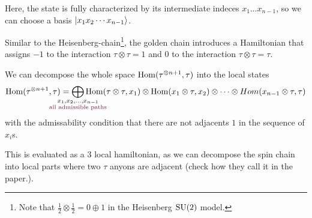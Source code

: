 
Here, the state is fully characterized by its intermediate indeces $x_1 \ldots
x_{n-1}$, so we can choose a basis $\left| x_1 x_2 \cdots x_{n-1}  \right\rangle$.

Similar to the Heisenberg-chain\footnote{Note that $\frac{1}{2} \otimes
\frac{1}{2} = 0 \oplus 1$ in the Heisenberg $\mathrm{SU}(2)$ model.}, the golden chain
introduces a Hamiltonian that assigns $-1$ to the interaction $\tau \otimes \tau
= 1$ and $0$ to the interaction $\tau \otimes \tau = \tau$.

We can decompose the whole space $\operatorname{Hom}(\tau^{\otimes n+1}, \tau)$ into the local
states
\begin{equation}
  \Hom(\tau^{\otimes n+1}, \tau)
  =
  \bigoplus_{\mathclap{\substack{x_1, x_2, \ldots, x_{n-1} \\ \text{\color{RoyalBlue}{all admissible paths}}}}}
  \Hom(\tau \otimes \tau, x_1) \otimes \Hom(x_1 \otimes \tau, x_2)
  \otimes \cdots \otimes Hom(x_{n-1} \otimes \tau, \tau) 
\end{equation}
with the admissability condition that there are not adjacents $1$ in the
sequence of $x_i$s.

This is evaluated as a $3$ local hamiltonian, as we can decompose the spin chain
into local parts where two $\tau$ anyons are adjacent (check how they call it in
the paper.).

